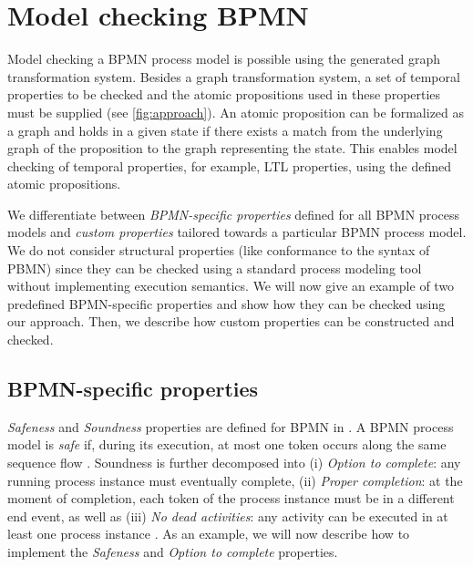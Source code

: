 \documentclass[submission, copyright, creativecommons]{eptcs}
\begin{document}


\section{Model checking BPMN} \label{sec:modelChecking}

Model checking a BPMN process model is possible using the generated graph transformation system.
Besides a graph transformation system, a set of temporal properties to be checked and the atomic propositions used in these properties must be supplied (see \cref{fig:approach}).
An atomic proposition can be formalized as a graph and holds in a given state if there exists a match from the underlying graph of the proposition to the graph representing the state.
This enables model checking of temporal properties, for example, LTL properties, using the defined atomic propositions.

We differentiate between \emph{BPMN-specific properties} defined for all BPMN process models and \emph{custom properties} tailored towards a particular BPMN process model.
We do not consider structural properties (like conformance to the syntax of PBMN) since they can be checked using a standard process modeling tool without implementing execution semantics.
We will now give an example of two predefined BPMN-specific properties and show how they can be checked using our approach.
Then, we describe how custom properties can be constructed and checked.

\subsection{BPMN-specific properties}
\textit{Safeness} and \textit{Soundness} properties are defined for BPMN in \cite{corradiniClassificationBPMNCollaborations2018}.
A BPMN process model is \emph{safe} if, during its execution, at most one token occurs along the same sequence flow \cite{corradiniClassificationBPMNCollaborations2018}.
Soundness is further decomposed into (i) \emph{Option to complete}: any running process instance must eventually complete, (ii) \emph{Proper completion}: at the moment of completion, each token of the process instance must be in a different end event, as well as (iii) \emph{No dead activities}: any activity can be executed in at least one process instance \cite{corradiniClassificationBPMNCollaborations2018}.
As an example, we will now describe how to implement the \emph{Safeness} and \emph{Option to complete} properties.
\end{document}
